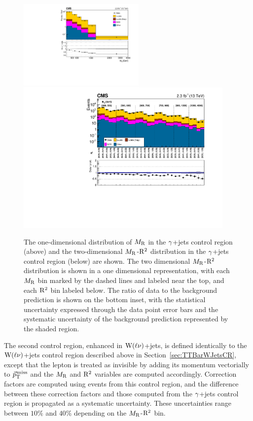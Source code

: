 \begin{figure}[!htb] \centering
\includegraphics[width=0.55\textwidth]{figs/analysis13TeV/Znunu/Razor_PhotonControlRegion_MR_PhotonCR_Logy.pdf} \\
\includegraphics[width=0.95\textwidth]{figs/analysis13TeV/Znunu/Razor_PhotonControlRegion_MRRsqUnrolled_PhotonCR_Logy.pdf}
\caption{The one-dimensional distribution of $M_\mathrm{R}$ in the $\gamma$+jets control region
  (above) and the two-dimensional $M_\mathrm{R}$-$\mathrm{R}^2$ distribution in
  the $\gamma$+jets control region (below) are shown. The two dimensional $M_\mathrm{R}$-$\mathrm{R}^2$ distribution is shown
in a one dimensional representation, with each $M_\mathrm{R}$ bin marked by the dashed lines and labeled near the top,
and each $\mathrm{R}^2$ bin labeled below. The ratio of data to the background prediction is shown on the bottom inset, with
the statistical uncertainty expressed through the data point error bars and the systematic uncertainty of the
background prediction represented by the shaded region. 
} 
\label{fig:Znn_PhotonJets}
\end{figure}


The second control region, enhanced in $\mathrm{W}(\ell\nu)$+jets, is defined identically to the $\mathrm{W}(\ell\nu)$+jets control region described
above in Section~\ref{sec:TTBarWJetsCR}, except that the lepton is treated as invisible
by adding its momentum vectorially to ${\vec p}_{\mathrm{T}}^{\kern1pt\text{miss}}$ and the $M_\mathrm{R}$ and $\mathrm{R}^2$
variables are computed accordingly. Correction factors are computed using events from this control region,
and the difference between these correction factors and those computed from the $\gamma$+jets control region
is propagated as a systematic uncertainty.  These uncertainties range between $10\%$ and $40\%$ depending on the $M_\mathrm{R}$-$\mathrm{R}^2$ bin. 

